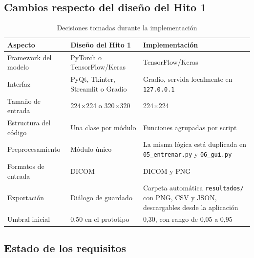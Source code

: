 \documentclass[11.5pt]{article}
\begin{document}
\subsection{Cambios respecto del diseño del Hito 1}

\begin{table}[H]
\centering
\small
\caption{Decisiones tomadas durante la implementación}
\label{tab:cambios}
\begin{tabularx}{\textwidth}{L{3.2cm} X X}
\toprule
Aspecto & Diseño del Hito 1 & Implementación \\
\midrule
Framework del modelo & PyTorch o TensorFlow/Keras & TensorFlow/Keras \\
Interfaz & PyQt, Tkinter, Streamlit o Gradio & Gradio, servida localmente en \texttt{127.0.0.1} \\
Tamaño de entrada & 224$\times$224 o 320$\times$320 & 224$\times$224 \\
Estructura del código & Una clase por módulo & Funciones agrupadas por script \\
Preprocesamiento & Módulo único & La misma lógica está duplicada en \texttt{05\_entrenar.py} y \texttt{06\_gui.py} \\
Formatos de entrada & DICOM & DICOM y PNG \\
Exportación & Diálogo de guardado & Carpeta automática \texttt{resultados/} con PNG, CSV y JSON, descargables desde la aplicación \\
Umbral inicial & 0,50 en el prototipo & 0,30, con rango de 0,05 a 0,95 \\
\bottomrule
\end{tabularx}
\end{table}

\subsection{Estado de los requisitos}
\end{document}

